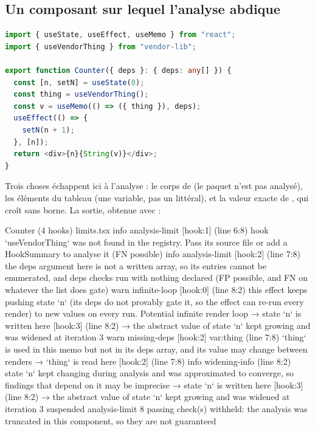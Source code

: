 \subsection{Un composant sur lequel l'analyse abdique}

\begin{lstlisting}[language=TypeScript,caption={\file{/tmp/ch20/limits.tsx} : un hook de bibliothèque, des deps illisibles, un compteur qui boucle},label={lst:regles-effets-limits}]
import { useState, useEffect, useMemo } from "react";
import { useVendorThing } from "vendor-lib";

export function Counter({ deps }: { deps: any[] }) {
  const [n, setN] = useState(0);
  const thing = useVendorThing();
  const v = useMemo(() => ({ thing }), deps);
  useEffect(() => {
    setN(n + 1);
  }, [n]);
  return <div>{n}{String(v)}</div>;
}
\end{lstlisting}

Trois choses échappent ici à l'analyse : le corps de  (le paquet  n'est pas analysé), les éléments du tableau  (une variable, pas un littéral), et la valeur exacte de , qui croît sans borne. La sortie, obtenue avec  :

\begin{sortie}
  Counter  (4 hooks)  limits.tsx
    info   analysis-limit  [hook:1]  (line 6:8)  hook `useVendorThing` was not found in the registry. Pass its source file or add a HookSummary to analyse it (FN possible)
    info   analysis-limit  [hook:2]  (line 7:8)  the deps argument here is not a written array, so its entries cannot be enumerated, and deps checks run with nothing declared (FP possible, and FN on whatever the list does gate)
    warn   infinite-loop  [hook:0]  (line 8:2)  this effect keeps pushing state `n` (its deps do not provably gate it, so the effect can re-run every render) to new values on every run. Potential infinite render loop
       → state `n` is written here [hook:3] (line 8:2)
       → the abstract value of state `n` kept growing and was widened at iteration 3
    warn   missing-deps  [hook:2]  var:thing  (line 7:8)  `thing` is used in this memo but not in its deps array, and its value may change between renders
       → `thing` is read here [hook:2] (line 7:8)
    info   widening-info  (line 8:2)  state `n` kept changing during analysis and was approximated to converge, so findings that depend on it may be imprecise
       → state `n` is written here [hook:3] (line 8:2)
       → the abstract value of state `n` kept growing and was widened at iteration 3
    suspended  analysis-limit  8 passing check(s) withheld: the analysis was truncated in this component, so they are not guaranteed
\end{sortie}

